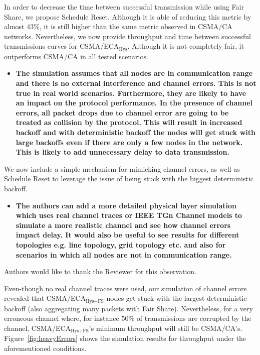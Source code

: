\documentclass[]{article}
\begin{document}
	In order to decrease the time between successful transmission while using Fair Share, we propose Schedule Reset. Although it is able of reducing this metric by almost $43\%$, it is still higher than the same metric observed in CSMA/CA networks. Nevertheless, we now provide throughput and time between successful transmissions curves for CSMA/ECA$_{\text{Hys}}$. Although it is not completely fair, it outperforms CSMA/CA in all tested scenarios.

%	
	\begin{itemize}
		\item {\bfseries The simulation assumes that all nodes are in communication range and there is no external interference and channel errors. This is not true in real world scenarios. Furthermore, they are likely to have an impact on the protocol performance. In the presence of channel errors, all packet drops due to channel error are going to be treated as collision by the protocol. This will result in increased backoff and with deterministic backoff the nodes will get stuck with large backoffs even if there are only a few nodes in the network. This is likely to add unnecessary delay to data transmission.}
	\end{itemize}
	
		We now include a simple mechanism for mimicking channel errors, as well as Schedule Reset to leverage the issue of being stuck with the biggest deterministic backoff.
		
	\begin{itemize}
		\item {\bfseries The authors can add a more detailed physical layer simulation which uses real channel traces or IEEE TGn Channel models to simulate a more realistic channel and see how channel errors impact delay. It would also be useful to see results for different topologies e.g. line topology, grid topology etc. and also for scenarios in which all nodes are not in communication range.}
	\end{itemize}

		Authors would like to thank the Reviewer for this observation.
	
		Even-though no real channel traces were used, our simulation of channel errors revealed that CSMA/ECA$_{\text{Hys+FS}}$ nodes get stuck with the largest deterministic backoff (also aggregating many packets with Fair Share). Nevertheless, for a very erroneous channel where, for instance $50\%$ of transmissions are corrupted by the channel, CSMA/ECA$_{\text{Hys+FS}}$'s minimum throughput will still be CSMA/CA's. Figure~\ref{fig:heavyErrors} shows the simulation results for throughput under the aforementioned conditions. 
		
\end{document}
